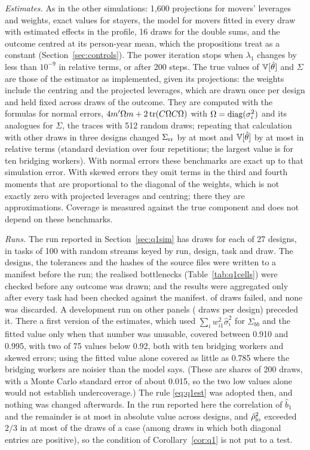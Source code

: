 \emph{Estimates.} As in the other simulations: 1,600 projections for movers' leverages and weights, exact values
for stayers, the model for movers fitted in every draw with estimated effects in the profile, 16 draws for the
double sums, and the outcome centred at its person-year mean, which the propositions treat as a constant
(Section~\ref{sec:controls}). The power iteration stops when $\lambda_1$ changes by less than $10^{-9}$ in
relative terms, or after 200 steps. The true values of $\mathbb{V}[\hat\theta]$ and $\Sigma$ are those of the estimator
as implemented, given its projections: the weights include the centring and the projected leverages, which are
drawn once per design and held fixed across draws of the outcome. They are computed with the formulas for
normal errors, $4m'\Omega m+2\operatorname{tr}(C\Omega C\Omega)$ with $\Omega=\operatorname{diag}(\sigma_i^2)$ and its analogues for $\Sigma$,
the traces with 512 random draws; repeating that calculation with other draws in three designs changed
$\Sigma_{\rm rr}$ by at most  and $\mathbb{V}[\hat\theta]$ by at most  in relative terms (standard
deviation over four repetitions; the largest value is for ten bridging workers). With normal errors these
benchmarks are exact up to that simulation error. With skewed errors they omit terms in the third and fourth
moments that are proportional to the diagonal of the weights, which is not exactly zero with projected
leverages and centring; there they are approximations. Coverage is measured against the true component and
does not depend on these benchmarks.

\emph{Runs.} The run reported in Section~\ref{sec:q1sim} has  draws for each of 27 designs, in tasks of
100 with random streams keyed by run, design, task and draw. The designs, the tolerances and the hashes of the
source files were written to a manifest before the run; the realised bottlenecks (Table~\ref{tab:q1cells}) were
checked before any outcome was drawn; and the results were aggregated only after every task had been checked
against the manifest.  of  draws failed, and none was discarded. A
development run on other panels ( draws per design) preceded it. There a first version of the
estimates, which used $\sum_iw_{i1}^2\hat\sigma_i^2$ for $\hat\Sigma_{bb}$ and the fitted value only when that number
was unusable, covered between 0.910 and 0.995, with two of 75 values below 0.92, both with ten bridging workers
and skewed errors; using the fitted value alone covered as little as 0.785 where the bridging workers are
noisier than the model says. (These are shares of 200 draws, with a Monte Carlo standard error of about 0.015,
so the two low values alone would not establish undercoverage.) The rule \eqref{eq:q1est} was adopted then, and
nothing was changed afterwards. In the run reported here the correlation of $\hat b_1$ and the remainder is at
most  in absolute value across designs, and $\hat\rho_{\rm lo}^2$ exceeded $2/3$ in at most
 of the draws of a case (among draws in which both diagonal entries are positive), so the
condition of Corollary~\ref{cor:q1} is not put to a test.

